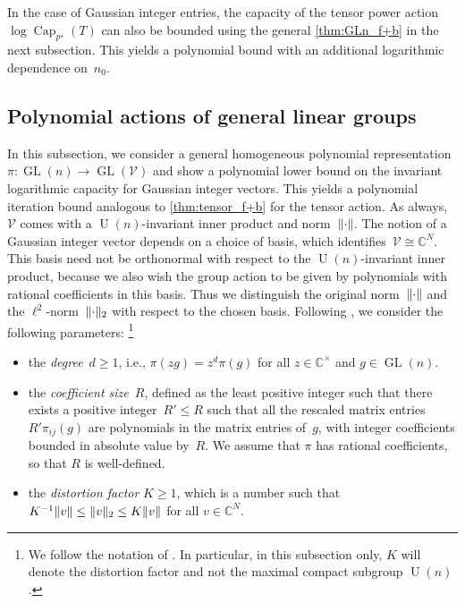 \documentclass[11pt,letterpaper]{article}
\numberwithin{equation}{section}
\newcommand{\CC}{\mathbb{C}}
\newcommand{\VV}{\mathcal{V}}
\DeclareMathOperator{\U}{U}
\DeclareMathOperator{\Capacity}{Cap}
\DeclareMathOperator{\GL}{GL}
\DeclarePairedDelimiter\norm{\lVert}{\rVert}
\begin{document}
In the case of Gaussian integer entries, the capacity of the tensor power action~$\log\Capacity_{p^\star}(T)$ can also be bounded using the general \cref{thm:GLn_f+b} in the next subsection.
This yields a polynomial bound with an additional logarithmic dependence on~$n_0$.

\subsection{Polynomial actions of general linear groups}\label{sub:GLaction}
In this subsection, we consider a general homogeneous polynomial representation $\pi \colon \GL(n) \to \GL(\VV)$ and show a polynomial lower bound on the invariant logarithmic capacity for Gaussian integer vectors.
This yields a polynomial iteration bound analogous to \cref{thm:tensor_f+b} for the tensor action.
As always, $\VV$ comes with a $\U(n)$-invariant inner product and norm~$\norm{\cdot}$.
The notion of a Gaussian integer vector depends on a choice of basis, which identifies~$\VV\cong\CC^N$.
This basis need not be orthonormal with respect to the $\U(n)$-invariant inner product, because we also wish the group action to be given by polynomials with rational coefficients in this basis.
Thus we distinguish the original norm~$\norm{\cdot}$ and the $\ell^2$-norm~$\norm{\cdot}_2$ with respect to the chosen basis.
Following \cite{BFGOWW2019}, we consider the following parameters:%
\footnote{We follow the notation of \cite{BFGOWW2019}. In particular, in this subsection only, $K$ will denote the distortion factor and not the maximal compact subgroup $\U(n)$.}
\begin{itemize}
\item the \emph{degree}~$d\geq1$, i.e., $\pi(z g) = z^d \pi(g)$ for all $z\in\CC^\times$ and $g\in\GL(n)$.
\item the \emph{coefficient size}~$R$, defined as the least positive integer such that there exists a positive integer~$R' \leq R$ such that all the rescaled matrix entries~$R' \pi_{ij}(g)$ are polynomials in the matrix entries of~$g$, with integer coefficients bounded in absolute value by~$R$.
We assume that $\pi$ has rational coefficients, so that $R$ is well-defined.
\item the \emph{distortion factor} $K\geq1$, which is a number such that $K^{-1} \norm v \leq \norm v_2 \leq K \norm v$ for all $v \in \CC^N$.
\end{itemize}
\end{document}
